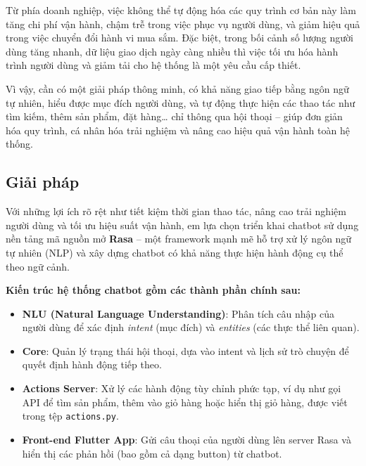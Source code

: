 \documentclass[../DoAn.tex]{subfiles}
\begin{document}
Từ phía doanh nghiệp, việc không thể tự động hóa các quy trình cơ bản này làm tăng chi phí vận hành, chậm trễ trong việc phục vụ người dùng, và giảm hiệu quả trong việc chuyển đổi hành vi mua sắm. Đặc biệt, trong bối cảnh số lượng người dùng tăng nhanh, dữ liệu giao dịch ngày càng nhiều thì việc tối ưu hóa hành trình người dùng và giảm tải cho hệ thống là một yêu cầu cấp thiết.

Vì vậy, cần có một giải pháp thông minh, có khả năng giao tiếp bằng ngôn ngữ tự nhiên, hiểu được mục đích người dùng, và tự động thực hiện các thao tác như tìm kiếm, thêm sản phẩm, đặt hàng… chỉ thông qua hội thoại – giúp đơn giản hóa quy trình, cá nhân hóa trải nghiệm và nâng cao hiệu quả vận hành toàn hệ thống.

\subsection{Giải pháp}

Với những lợi ích rõ rệt như tiết kiệm thời gian thao tác, nâng cao trải nghiệm người dùng và tối ưu hiệu suất vận hành, em lựa chọn triển khai chatbot sử dụng nền tảng mã nguồn mở \textbf{Rasa} – một framework mạnh mẽ hỗ trợ xử lý ngôn ngữ tự nhiên (NLP) và xây dựng chatbot có khả năng thực hiện hành động cụ thể theo ngữ cảnh.

\textbf{Kiến trúc hệ thống chatbot gồm các thành phần chính sau:}
\begin{itemize}
    \item \textbf{NLU (Natural Language Understanding)}: Phân tích câu nhập của người dùng để xác định \textit{intent} (mục đích) và \textit{entities} (các thực thể liên quan).
    \item \textbf{Core}: Quản lý trạng thái hội thoại, dựa vào intent và lịch sử trò chuyện để quyết định hành động tiếp theo.
    \item \textbf{Actions Server}: Xử lý các hành động tùy chỉnh phức tạp, ví dụ như gọi API để tìm sản phẩm, thêm vào giỏ hàng hoặc hiển thị giỏ hàng, được viết trong tệp \texttt{actions.py}.
    \item \textbf{Front-end Flutter App}: Gửi câu thoại của người dùng lên server Rasa và hiển thị các phản hồi (bao gồm cả dạng button) từ chatbot.
\end{itemize}
\end{document}
